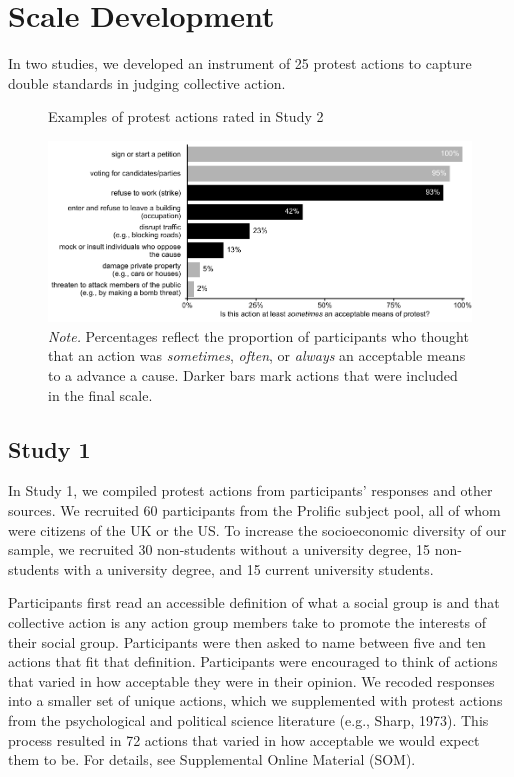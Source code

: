 \documentclass[twocolumn, 11pt, letterpaper]{article}
\begin{document}
\hypertarget{scale-development}{%
\section{Scale Development}\label{scale-development}}

In two studies, we developed an instrument of 25 protest actions to
capture double standards in judging collective action.

\begin{figure}[!t]
\centering
\caption{Examples of protest actions rated in Study 2}
\includegraphics[scale=1]{../Scale Development/figures/figure-2}
\caption*{\textit{Note.} Percentages reflect the proportion of participants who thought that an action was \textit{sometimes}, \textit{often}, or \textit{always} an acceptable means to a advance a cause. Darker bars mark actions that were included in the final scale.}
\label{fig:f2}
\end{figure}

\hypertarget{study-1}{%
\subsection{Study 1}\label{study-1}}

In Study 1, we compiled protest actions from participants' responses and
other sources. We recruited 60 participants from the Prolific subject
pool, all of whom were citizens of the UK or the US. To increase the
socioeconomic diversity of our sample, we recruited 30 non-students
without a university degree, 15 non-students with a university degree,
and 15 current university students.

Participants first read an accessible definition of what a social group
is and that collective action is any action group members take to
promote the interests of their social group. Participants were then
asked to name between five and ten actions that fit that definition.
Participants were encouraged to think of actions that varied in how
acceptable they were in their opinion. We recoded responses into a
smaller set of unique actions, which we supplemented with protest
actions from the psychological and political science literature (e.g.,
Sharp, 1973). This process resulted in 72 actions that varied in how
acceptable we would expect them to be. For details, see Supplemental
Online Material (SOM).
\end{document}
